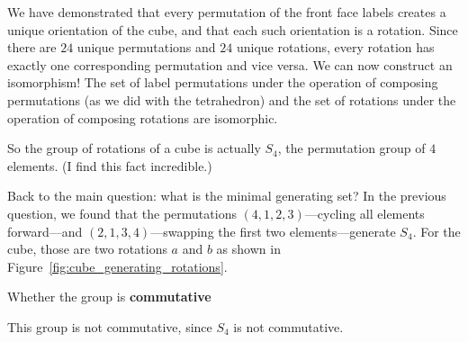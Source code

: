 \documentclass[../key.tex]{subfiles}
\begin{document}
\noindent We have demonstrated that every permutation of the front face labels creates a unique orientation of the cube, and that each such orientation is a rotation. Since there are $24$ unique permutations and $24$ unique rotations, every rotation has exactly one corresponding permutation and vice versa. We can now construct an isomorphism! The set of label permutations under the operation of composing permutations (as we did with the tetrahedron) and the set of rotations under the operation of composing rotations are isomorphic.

So the group of rotations of a cube is actually $S_4$, the permutation group of $4$ elements. (I find this fact incredible.)

Back to the main question: what is the minimal generating set? In the previous question, we found that the permutations $(4,1,2,3)$---cycling all elements forward---and $(2,1,3,4)$---swapping the first two elements---generate $S_4$. For the cube, those are two rotations $a$ and $b$ as shown in Figure~\ref{fig:cube_generating_rotations}.

\begin{inner_problem}
\item Whether the group is \textbf{commutative}
\end{inner_problem}

\noindent This group is not commutative, since $S_4$ is not commutative.
\end{document}
